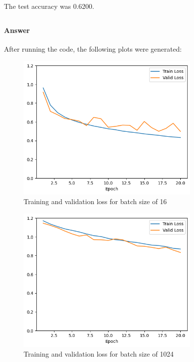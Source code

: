 \documentclass{article}
\begin{document}
The test accuracy was 0.6200.

\subsection{}

\subsubsection{}
\paragraph{Answer} After running the code, the following plots were generated:
\begin{figure}[H]
    \centering
    \includegraphics[width=0.8\textwidth]{"plots/mlp-training-loss-batch-16-lr-0.1-epochs-20-hidden-200-dropout-0.0-l2-0-layers-2-act-relu-opt-sgd.png"}
    \caption{Training and validation loss for batch size of 16}
    \label{2.2a batch size 16}
\end{figure}

\begin{figure}[H]
    \centering
    \includegraphics[width=0.8\textwidth]{"plots/mlp-training-loss-batch-1024-lr-0.1-epochs-20-hidden-200-dropout-0.0-l2-0-layers-2-act-relu-opt-sgd.png"}
    \caption{Training and validation loss for batch size of 1024}
    \label{2.2a batch size 1024}
\end{figure}
\end{document}
